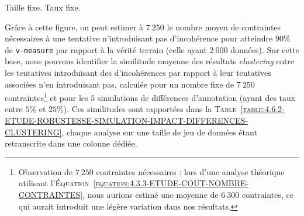 				Taille fixe.
				Taux fixe.
			
			
			Grâce à cette figure, on peut estimer à $7~250$ le nombre moyen de contraintes nécessaires à une tentative n'introduisant pas d'incohérence pour atteindre $90$\% de \texttt{v-measure} par rapport à la vérité terrain (celle ayant $2~000$ données).
			Sur cette base, nous pouvons identifier la similitude moyenne des résultats \textit{clustering} entre les tentatives introduisant des d'incohérences par rapport à leur tentatives associées n'en introduisant pas, calculée pour un nombre fixe de $7~250$ contraintes\footnote{
				Observation de $7~250$ contraintes nécessaires : lors d'une analyse théorique utilisant l'\textsc{Équation~\ref{equation:4.3.3-ETUDE-COUT-NOMBRE-CONTRAINTES}}, nous aurions estimé une moyenne de $6~300$ contraintes, ce qui aurait introduit une légère variation dans nos résultats.
			} et pour les $5$ simulations de différences d'annotation (ayant des taux entre $5$\% et $25$\%).
			Ces similitudes sont rapportées dans la \textsc{Table~\ref{table:4.6.2-ETUDE-ROBUSTESSE-SIMULATION-IMPACT-DIFFERENCES-CLUSTERING}}, chaque analyse sur une taille de jeu de données étant retranscrite dans une colonne dédiée.
			
